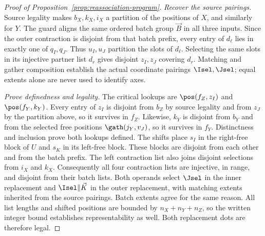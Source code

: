 \label{app:reassociation-proof}
\begin{proof}[Proof of Proposition~\ref{prop:reassociation-program}]
\emph{Recover the source pairings.}
Source legality makes $b_X,k_X,i_X$ a partition of the positions of $X$,
and similarly for $Y$. The guard aligns the same ordered batch group $\vec B$
in all three inputs. Since the outer contraction is disjoint from that
batch prefix, every entry of $d_\ell$ lies in exactly one of $q_I,q_J$.
Thus $u_I,u_J$ partition the slots of $d_\ell$. Selecting the same slots
in its injective partner list $d_r$ gives disjoint $z_I,z_J$ covering
$d_r$. Matching and gather composition establish the actual coordinate
pairings $\Isel,\Jsel$; equal extents alone are never used to identify axes.

\emph{Prove definedness and legality.}
The critical lookups are $\pos(f_Z,z_I)$ and $\pos(f_Y,k_Y)$.
Every entry of $z_I$ is disjoint from $b_Z$ by source legality and from
$z_J$ by the partition above, so it survives in $f_Z$.
Likewise, $k_Y$ is disjoint from $b_Y$ and from the selected free positions
$\gath(j_Y,v_J)$, so it survives in $f_Y$. Distinctness and inclusion
prove both lookups defined. The shifts place $s_I$ in the right-free block
of $U$ and $s_K$ in its left-free block. These blocks are disjoint from
each other and from the batch prefix. The left contraction list also
joins disjoint selections from $i_X$ and $k_X$. Consequently all four
contraction lists are injective, in range, and disjoint from their batch
lists. Both operands select $\Jsel$ in the inner replacement and
$\Isel\Vert \vec K$ in the outer replacement, with matching extents inherited
from the source pairings. Batch extents agree for the same reason.
All list lengths and shifted positions are bounded by $n_X+n_Y+n_Z$,
so the written integer bound establishes representability as well.
Both replacement dots are therefore legal.


\end{proof}
